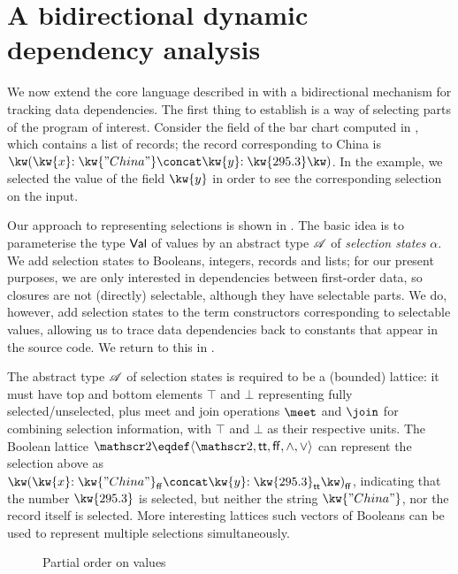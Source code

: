 \section{A bidirectional dynamic dependency analysis}
\label{sec:data-dependencies}

We now extend the core language described in  with a bidirectional mechanism for tracking data dependencies. The first thing to establish is a way of selecting parts of the program of interest. Consider the  field of the bar chart computed in , which contains a list of records; the record corresponding to China is $\exRec{\bind{\kw{x}}{\kw{"China"}} \concat \bind{\kw{y}}{\kw{295.3}}}$. In the example, we selected the value of the field $\kw{y}$ in order to see the corresponding selection on the input.

Our approach to representing selections is shown in . The basic idea is to parameterise the type $\textup{\textsf{Val}}$ of values by an abstract type $\mathscr{A}$ of \emph{selection states} $\alpha$. We add selection states to Booleans, integers, records and lists; for our present purposes, we are only interested in dependencies between first-order data, so closures are not (directly) selectable, although they have selectable parts. We do, however, add selection states to the term constructors corresponding to selectable values, allowing us to trace data dependencies back to constants that appear in the source code. We return to this in .



The abstract type $\mathscr{A}$ of selection states is required to be a (bounded) lattice: it must have top and bottom elements $\top$ and $\bot$ representing fully selected/unselected, plus meet and join operations $\meet$ and $\join$ for combining selection information, with $\top$ and $\bot$ as their respective units. The Boolean lattice $\Bool \eqdef \Lattice{\Bool}{\TT}{\FF}{\wedge}{\vee}$ can represent the selection above as $\annRec{\bind{\kw{x}}{\annStr{\kw{"China"}}{\FF}} \concat \bind{\kw{y}}{\annInt{\kw{295.3}}{\TT}}}{\FF}$, indicating that the number $\exInt{\kw{295.3}}$ is selected, but neither the string $\exStr{\kw{"China"}}$, nor the record itself is selected. More interesting lattices such vectors of Booleans can be used to represent multiple selections simultaneously.

\begin{figure}
   
   \caption{Partial order on values}
   \label{fig:data-dependencies:leq}
\end{figure}



